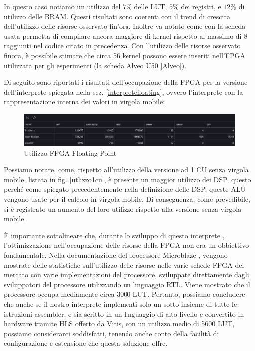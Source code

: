 In questo caso notiamo un utilizzo del $7 \%$ delle LUT, $5 \%$ dei registri, e $12 \%$ di utilizzo delle BRAM. Questi risultati sono coerenti con il trend di crescita dell'utilizzo delle risorse osservato fin'ora. Inoltre va notato come con la scheda usata permetta di compilare ancora maggiore di kernel rispetto al massimo di 8 raggiunti nel codice citato in precedenza. Con  l'utilizzo delle risorse osservato finora, è possibile stimare che circa 56 kernel possono essere inseriti nell'FPGA utilizzata per gli esperimenti (la scheda Alveo U50 \ref{Alveo}).

\vspace{0.3cm}

\noindent Di seguito sono riportati i risultati dell'occupazione della FPGA per la versione dell'interprete spiegata nella sez. \ref{interpretefloating}, ovvero l'interprete con la rappresentazione interna dei valori in virgola mobile:

\begin{figure}[h!]
\centering
\includegraphics[scale=0.40]{images/Capitolo5/12_im.png}
\caption{Utilizzo FPGA Floating Point}
\label{utilizzo4cu}
\end{figure}

Possiamo notare, come, rispetto all'utilizzo della versione ad 1 CU senza virgola mobile, listata in fig. \ref{utlizzo1cu}, è presente un maggior utilizzo dei DSP, questo perché come spiegato precedentemente nella definizione delle DSP, queste ALU vengono usate per il calcolo in virgola mobile. Di conseguenza, come prevedibile, si è registrato un aumento del loro utilizzo rispetto alla versione senza virgola mobile.

\vspace{0.3cm}

È importante sottolineare che, durante lo sviluppo di questo interprete , l'ottimizzazione nell'occupazione delle risorse della FPGA non era un obbiettivo fondamentale. Nella documentazione del processore Microblaze \cite{sitoMicroblaze}, vengono mostrate delle statistiche sull'utilizzo delle risorse nelle varie schede FPGA del mercato con varie implementazioni del processore, sviluppate direttamente dagli sviluppatori del processore utilizzando un linguaggio RTL. Viene mostrato che il processore occupa mediamente circa 3000 LUT. Pertanto, possiamo concludere che anche se il nostro interprete implementi solo un sotto insieme di tutte le istruzioni assembler, e sia scritto in un linguaggio di alto livello e convertito in hardware tramite HLS offerto da Vitis, con un utilizzo  medio di 5600 LUT, possiamo considerarci soddisfatti, tenendo anche conto della facilità di configurazione e estensione che questa soluzione offre.

